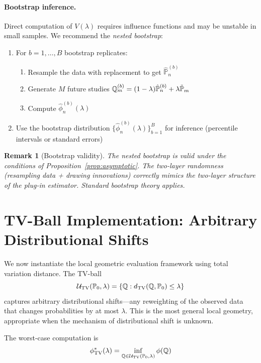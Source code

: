 \documentclass{article}
\newtheorem{remark}{Remark}
\newcommand{\PP}{\mathbb{P}}
\begin{document}
\paragraph{Bootstrap inference.}
Direct computation of $V(\lambda)$ requires influence functions and may be
unstable in small samples. We recommend the \textit{nested bootstrap}:
\begin{enumerate}
    \item For $b = 1, \ldots, B$ bootstrap replicates:
          \begin{enumerate}
              \item Resample the data with replacement to get $\hat{\PP}_n^{(b)}$
              \item Generate $M$ future studies $\Q_m^{(b)} = (1-\lambda)\hat{\PP}_n^{(b)} + \lambda\tilde{\PP}_m$
              \item Compute $\hat{\phi}_n^{(b)}(\lambda)$
          \end{enumerate}
    \item Use the bootstrap distribution $\{\hat{\phi}_n^{(b)}(\lambda)\}_{b=1}^B$
          for inference (percentile intervals or standard errors)
\end{enumerate}

\begin{remark}[Bootstrap validity]
The nested bootstrap is valid under the conditions of Proposition~\ref{prop:asymptotic}.
The two-layer randomness (resampling data + drawing innovations) correctly
mimics the two-layer structure of the plug-in estimator. Standard bootstrap
theory applies.
\end{remark}

\section{TV-Ball Implementation: Arbitrary Distributional Shifts}\label{sec:tv-implementation}

We now instantiate the local geometric evaluation framework using total variation distance. The TV-ball
\begin{equation}
    \cU_{\mathrm{TV}}(\PP_0, \lambda) = \{\Q : d_{\mathrm{TV}}(\Q, \PP_0) \leq \lambda\}
\end{equation}
captures arbitrary distributional shifts---any reweighting of the observed data that changes probabilities by at most $\lambda$. This is the most general local geometry, appropriate when the mechanism of distributional shift is unknown.

The worst-case computation is
\begin{equation}
    \phi_{\mathrm{TV}}^*(\lambda) = \inf_{\Q \in \cU_{\mathrm{TV}}(\PP_0, \lambda)} \phi(\Q)
\end{equation}
\end{document}
